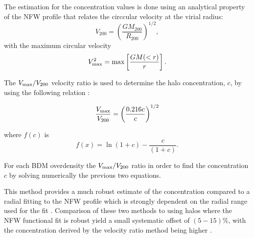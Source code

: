 \documentclass{article}
\begin{document}
The estimation for the concentration values is done using an
analytical property of the NFW profile that relates the circcular
velocity at the virial radius:
\begin{equation}
V_{200} = \left(\frac{GM_{200}}{R_{200}}\right)^{1/2},
\end{equation}
with the maximum circular velocity 
\begin{equation}
V_{\rm max}^{2} = {\rm max}\left[\frac{GM(<r)}{r}\right].
\end{equation}


The $V_{\rm max}/V_{200}$ velocity ratio is used to determine the halo
concentration, $c$, by using the following relation \citep{Bolshoi}:

\begin{equation}
\frac{V_{\rm max}}{V_{200}} = \left(\frac{0.216 c}{c}\right)^{1/2}
\end{equation}

where $f(c)$ is
\begin{equation}
f(x) = \ln(1+c) - \frac{c}{(1+c)}.
\end{equation}

For each BDM overdensity the $V_{\rm max}/V_{200}$ ratio in order to
find the concentration $c$ by solving numerically the previous two
equations. 

This method provides a much robust estimate of the concentration
compared to a radial fitting to the NFW profile which is strongly
dependent on the radial range used for the fit
\citep{Bolshoi,Meneghetti13}. Comparison of these two methods to
using halos where the NFW functional fit is robust yield a small
systematic offset of $(5-15)\%$, with the concentration  derived by
the velocity ratio method being higher \citep{Prada12}. 





\end{document}
